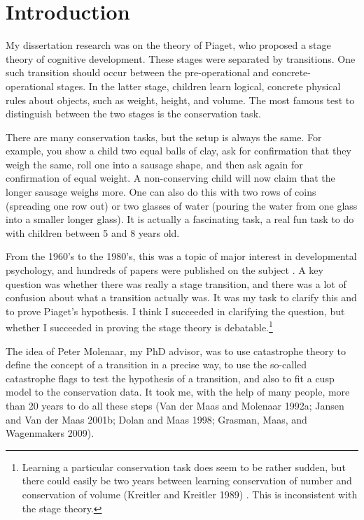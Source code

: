 \documentclass[
  a4paper,
  DIV=11,
  numbers=noendperiod,
  oneside]{scrreprt}
\begin{document}
\hypertarget{sec-Introduction}{%
\section{Introduction}\label{sec-Introduction}}

My dissertation research was on the theory of Piaget, who proposed a
stage theory of cognitive development. These stages were separated by
transitions. One such transition should occur between the
pre-operational and concrete-operational stages. In the latter stage,
children learn logical, concrete physical rules about objects, such as
weight, height, and volume. The most famous test to distinguish between
the two stages is the conservation task.

There are many conservation tasks, but the setup is always the same. For
example, you show a child two equal balls of clay, ask for confirmation
that they weigh the same, roll one into a sausage shape, and then ask
again for confirmation of equal weight. A non-conserving child will now
claim that the longer sausage weighs more. One can also do this with two
rows of coins (spreading one row out) or two glasses of water (pouring
the water from one glass into a smaller longer glass). It is actually a
fascinating task, a real fun task to do with children between 5 and 8
years old.

From the 1960's to the 1980's, this was a topic of major interest in
developmental psychology, and hundreds of papers were published on the
subject . A key question was whether there was really a stage
transition, and there was a lot of confusion about what a transition
actually was. It was my task to clarify this and to prove Piaget's
hypothesis. I think I succeeded in clarifying the question, but whether
I succeeded in proving the stage theory is debatable.\footnote{Learning
  a particular conservation task does seem to be rather sudden, but
  there could easily be two years between learning conservation of
  number and conservation of volume (Kreitler and Kreitler 1989) . This
  is inconsistent with the stage theory.}

The idea of Peter Molenaar, my PhD advisor, was to use catastrophe
theory to define the concept of a transition in a precise way, to use
the so-called catastrophe flags to test the hypothesis of a transition,
and also to fit a cusp model to the conservation data. It took me, with
the help of many people, more than 20 years to do all these steps (Van
der Maas and Molenaar 1992a; Jansen and Van der Maas 2001b; Dolan and
Maas 1998; Grasman, Maas, and Wagenmakers 2009).
\end{document}
